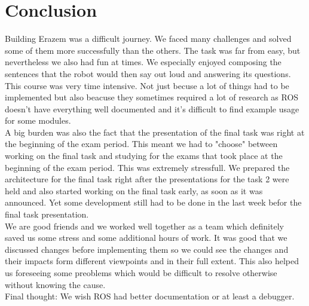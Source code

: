 \documentclass[12pt,a4paper]{article}
\begin{document}
	\section{Conclusion}
	Building Erazem was a difficult journey. We faced many challenges and solved some of them more successfully than the others. The task was far from easy, but nevertheless we also had fun at times. We especially enjoyed composing the sentences that the robot would then say out loud and answering its questions. \\

	This course was very time intensive. Not just becuse a lot of things had to be implemented but also beacuse they sometimes required a lot of research as ROS doesn't have everything well documented and it's difficult to find example usage for some modules. \\

	A big burden was also the fact that the presentation of the final task was right at the beginning of the exam period. This meant we had to "choose" between working on the final task and studying for the exams that took place at the beginning of the exam period. This was extremely stressfull. We prepared the architecture for the final task right after the presentations for the task 2 were held and also started working on the final task early, as soon as it was announced. Yet some development still had to be done in the last week befor the final task presentation. \\
	
	We are good friends and we worked well together as a team which definitely saved us some stress and some additional hours of work. It was good that we discussed changes before implementing them so we could see the changes and their impacts form different viewpoints and in their full extent. This also helped us foreseeing some preoblems which would be difficult to resolve otherwise without knowing the cause. \\

	Final thought: We wish ROS had better documentation or at least a debugger. \\

\end{document}
